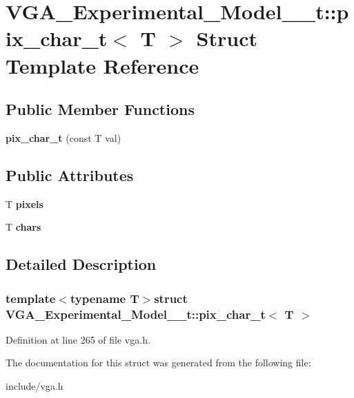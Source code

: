 \hypertarget{structVGA__Experimental__Model__1__t_1_1pix__char__t}{\section{V\-G\-A\-\_\-\-Experimental\-\_\-\-Model\-\_\-\_\-t\-:\-:pix\-\_\-char\-\_\-t$<$ T $>$ Struct Template Reference}
\label{structVGA__Experimental__Model__1__t_1_1pix__char__t}
}
\subsection*{Public Member Functions}
\begin{DoxyCompactItemize}
\item 
\hypertarget{structVGA__Experimental__Model__1__t_1_1pix__char__t_a640a5b84c010f8fc9937077c23578f83}{{\bfseries pix\-\_\-char\-\_\-t} (const T val)}\label{structVGA__Experimental__Model__1__t_1_1pix__char__t_a640a5b84c010f8fc9937077c23578f83}

\end{DoxyCompactItemize}
\subsection*{Public Attributes}
\begin{DoxyCompactItemize}
\item 
\hypertarget{structVGA__Experimental__Model__1__t_1_1pix__char__t_a10c1fc57ae4488dbf24be898a9200837}{T {\bfseries pixels}}\label{structVGA__Experimental__Model__1__t_1_1pix__char__t_a10c1fc57ae4488dbf24be898a9200837}

\item 
\hypertarget{structVGA__Experimental__Model__1__t_1_1pix__char__t_ad42e1c27286702f94259070fe6facbec}{T {\bfseries chars}}\label{structVGA__Experimental__Model__1__t_1_1pix__char__t_ad42e1c27286702f94259070fe6facbec}

\end{DoxyCompactItemize}


\subsection{Detailed Description}
\subsubsection*{template$<$typename T$>$struct V\-G\-A\-\_\-\-Experimental\-\_\-\-Model\-\_\-\_\-t\-::pix\-\_\-char\-\_\-t$<$ T $>$}



Definition at line 265 of file vga.\-h.



The documentation for this struct was generated from the following file\-:\begin{DoxyCompactItemize}
\item 
include/vga.\-h\end{DoxyCompactItemize}
